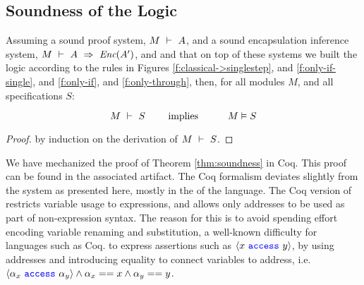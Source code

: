 \subsection{Soundness of the \Nec Logic}

\label{s:soundness}

\begin{theorem}[Soundness]
\label{thm:soundness}
\sophiaPonder[renamed H to S]{}
Assuming a sound \SpecO proof system, $M\ \vdash\ A$, and
a sound encapsulation inference system, $M\ \vdash\ A\ \Rightarrow\ \textit{Enc}(A')$,
 and  and that on top of these systems we built
 the \Nec logic according to the rules in Figures  \ref{f:classical->singlestep},  and \ref{f:only-if-single}, and \ref{f:only-if},  and \ref{f:only-through},   then, for    all modules $M$, and all \Nec specifications  $S$:
 
 $$\proves{M}{S}\ \ \ \ \ \ \ \mbox{implies}\ \ \ \ \ \  \ \ \ \satisfies{M}{S}$$
\end{theorem}

\begin{proof}
by induction on the derivation of $M\ \vdash\ S$.
\end{proof}

We have mechanized the proof of Theorem \ref{thm:soundness} in Coq. This 
proof can be found in the associated artifact. 
The   Coq formalism deviates slightly from the system as
presented here,  mostly in the  of the 
\SpecO language. The Coq version of \SpecO restricts variable usage to expressions, and allows only addresses to 
be used as part of non-expression syntax. 
The reason for this  is to avoid spending %
 effort encoding variable
renaming and substitution, a well-known difficulty for languages such as Coq. 
 to express assertions such as $\langle x\ {\color{blue}\texttt{access}}\ y \rangle$, by using addresses and introducing equality  %
to connect variables to address, i.e.
 $\langle \alpha_x\ {\color{blue}\texttt{access}}\ \alpha_y \rangle \wedge \alpha_x == x \wedge \alpha_y == y$.



